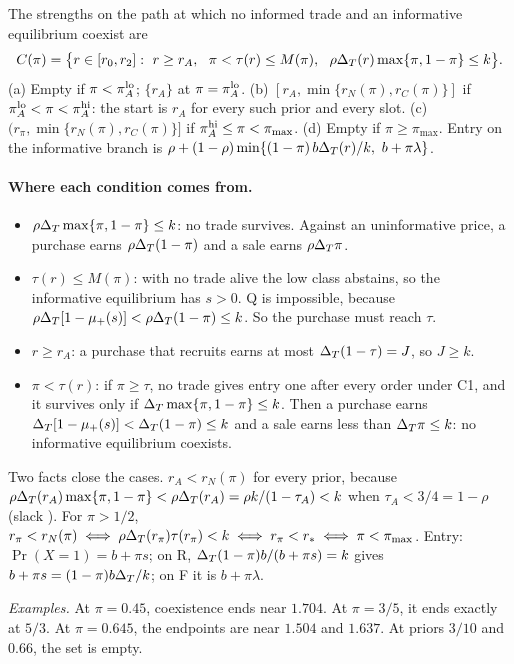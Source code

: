 \begin{resultbox}
The strengths on the path at which no informed trade and an informative equilibrium coexist are
\[
C(\pi)=\bigl\{r\in[r_0,r_2]:\ r\ge r_A,\ \ \pi<\tau(r)\le M(\pi),\ \ \rho\DT(r)\max\{\pi,1-\pi\}\le k\bigr\}.
\]
(a) Empty if \(\pi<\pi_A^{\rm lo}\); \(\{r_A\}\) at \(\pi=\pi_A^{\rm lo}\). (b) \([r_A,\min\{r_N(\pi),r_C(\pi)\}]\) if
\(\pi_A^{\rm lo}<\pi<\pi_A^{\rm hi}\): the start is \(r_A\) for every such prior and every slot. (c)
\((r_\pi,\min\{r_N(\pi),r_C(\pi)\}]\) if \(\pi_A^{\rm hi}\le\pi<\pi_{\max}\). (d) Empty if \(\pi\ge\pi_{\max}\). Entry on the
informative branch is \(\rho+(1-\rho)\min\{(1-\pi)\,b\DT(r)/k,\ b+\pi\lambda\}\).
\end{resultbox}

\paragraph{Where each condition comes from.}
\begin{itemize}[leftmargin=2em]
\item \(\rho\Delta_T\max\{\pi,1-\pi\}\le k\): no trade survives. Against an uninformative price, a purchase earns
\(\rho\Delta_T(1-\pi)\) and a sale earns \(\rho\Delta_T\pi\).
\item \(\tau(r)\le M(\pi)\): with no trade alive the low class abstains, so the informative equilibrium has \(s>0\). Q is
impossible, because \(\rho\Delta_T[1-\mu_+(s)]<\rho\Delta_T(1-\pi)\le k\). So the purchase must reach \(\tau\).
\item \(r\ge r_A\): a purchase that recruits earns at most \(\Delta_T(1-\tau)=J\), so \(J\ge k\).
\item \(\pi<\tau(r)\): if \(\pi\ge\tau\), no trade gives entry one after every order under C1, and it survives only if
\(\Delta_T\max\{\pi,1-\pi\}\le k\). Then a purchase earns \(\Delta_T[1-\mu_+(s)]<\Delta_T(1-\pi)\le k\) and a sale earns less than
\(\Delta_T\pi\le k\): no informative equilibrium coexists.
\end{itemize}
Two facts close the cases. \(r_A<r_N(\pi)\) for every prior, because
\(\rho\Delta_T(r_A)\max\{\pi,1-\pi\}<\rho\Delta_T(r_A)=\rho k/(1-\tau_A)<k\) when \(\tau_A<3/4=1-\rho\) (slack
). For \(\pi>1/2\), \(r_\pi<r_N(\pi)\iff\rho\Delta_T(r_\pi)\tau(r_\pi)<k\iff r_\pi<r_*\iff\pi<\pi_{\max}\).
Entry: \(\Pr(X=1)=b+\pi s\); on R, \(\Delta_T(1-\pi)b/(b+\pi s)=k\) gives \(b+\pi s=(1-\pi)b\Delta_T/k\); on F it is \(b+\pi\lambda\).

\emph{Examples.} At \(\pi=0.45\), coexistence ends near \(1.704\).
At \(\pi=3/5\), it ends exactly at \(5/3\).
At \(\pi=0.645\), the endpoints are near \(1.504\) and \(1.637\).
At priors \(3/10\) and \(0.66\), the set is empty. %

